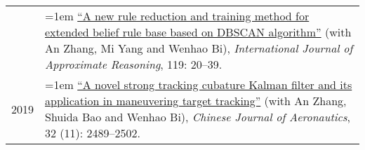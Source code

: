 \documentclass[11pt,english]{article}
\begin{document}
\begin{tabular}{p{.85in}>{\hangindent=1em}p{5.65in}<{\raggedright}}
 
 &  \href{https://doi.org/10.1016/j.ijar.2019.12.016}{``A new rule reduction and training method for extended belief rule base based on DBSCAN algorithm''} (with An Zhang, Mi Yang and Wenhao Bi), \textit{International Journal of Approximate Reasoning}, 119: 20--39. \\

2019 &  \href{https://doi.org/10.1016/j.cja.2019.07.025}{``A novel strong tracking cubature Kalman filter and its application in maneuvering target tracking''} (with An Zhang, Shuida Bao and Wenhao Bi), \textit{Chinese Journal of Aeronautics}, 32 (11): 2489--2502. \\
\end{tabular}
\end{document}
